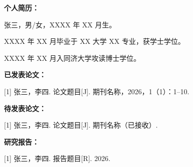\begin{thesiscv}
\textbf{个人简历：}

张三，男/女，XXXX 年 XX 月生。

XXXX 年 XX 月毕业于 XX 大学 XX 专业，获学士学位。

XXXX 年 XX 月入同济大学攻读博士学位。

\vspace{16bp}
\textbf{已发表论文：}

[1] 张三，李四. 论文题目[J]. 期刊名称，2026，1（1）：1--10.

\vspace{16bp}
\textbf{待发表论文：}

[1] 张三，李四. 论文题目[J]. 期刊名称（已接收）.

\vspace{16bp}
\textbf{研究报告：}

[1] 张三，李四. 报告题目[R]. 2026.
\end{thesiscv}
